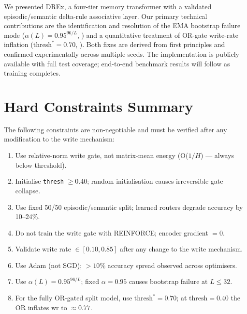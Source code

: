 \documentclass{article}
\begin{document}
We presented DREx, a four-tier memory transformer with a validated episodic/semantic
delta-rule associative layer.  Our primary technical contributions are the identification
and resolution of the EMA bootstrap failure mode
($\alpha(L) = 0.95^{96/L}$, ) and a quantitative treatment of
OR-gate write-rate inflation ($\mathrm{thresh}^* = 0.70$, ).  Both fixes
are derived from first principles and confirmed experimentally across multiple seeds.
The implementation is publicly available with full test coverage; end-to-end benchmark
results will follow as training completes.



\appendix

\section{Hard Constraints Summary}
\label{app:constraints}

The following constraints are non-negotiable and must be verified after any modification
to the write mechanism:

\begin{enumerate}
  \item Use relative-norm write gate, not matrix-mean energy (O($1/H$) — always below threshold).
  \item Initialise \texttt{thresh} $\geq 0.40$; random initialisation causes
        irreversible gate collapse.
  \item Use fixed 50/50 episodic/semantic split; learned routers degrade accuracy by
        10--24\%.
  \item Do not train the write gate with REINFORCE; encoder gradient $= 0$.
  \item Validate write rate $\in [0.10, 0.85]$ after any change to the write mechanism.
  \item Use Adam (not SGD); $> 10\%$ accuracy spread observed across optimisers.
  \item Use $\alpha(L) = 0.95^{96/L}$; fixed $\alpha = 0.95$ causes bootstrap failure at $L \leq 32$.
  \item For the fully OR-gated split model, use $\mathrm{thresh}^* = 0.70$; at
        $\mathrm{thresh} = 0.40$ the OR inflates $\mathrm{wr}$ to $\approx 0.77$.
\end{enumerate}
\end{document}
